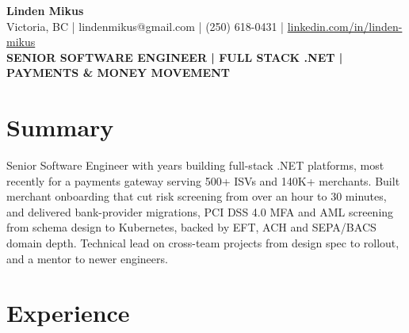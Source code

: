 \documentclass[10.5pt]{article}
\newcommand{\careerstartyear}{2013}
\newcommand{\yearsexperience}{\the\numexpr\year-\careerstartyear\relax}
\begin{document}
\begin{center}
  {\fontsize{22}{24}\selectfont\bfseries\color{accent} Linden Mikus}\\[3pt]
  {\small\color{textgray!75}
    Victoria, BC \;\textcolor{rulelight}{|}\; lindenmikus@gmail.com \;\textcolor{rulelight}{|}\; (250) 618-0431 \;\textcolor{rulelight}{|}\;
    \href{https://www.linkedin.com/in/linden-mikus/}{linkedin.com/in/linden-mikus}}\\[4pt]
  {\bfseries\color{accent}\small SENIOR SOFTWARE ENGINEER \;\textcolor{rulelight}{|}\; FULL STACK .NET \;\textcolor{rulelight}{|}\; PAYMENTS \& MONEY MOVEMENT}
\end{center}

\vspace{-4pt}

\section*{Summary}
Senior Software Engineer with \yearsexperience{} years building full-stack .NET platforms, most recently for a payments gateway serving 500+ ISVs and 140K+ merchants. Built merchant onboarding that cut risk screening from over an hour to 30 minutes, and delivered bank-provider migrations, PCI DSS 4.0 MFA and AML screening from schema design to Kubernetes, backed by EFT, ACH and SEPA/BACS domain depth. Technical lead on cross-team projects from design spec to rollout, and a mentor to newer engineers.

\section*{Experience}
\end{document}
